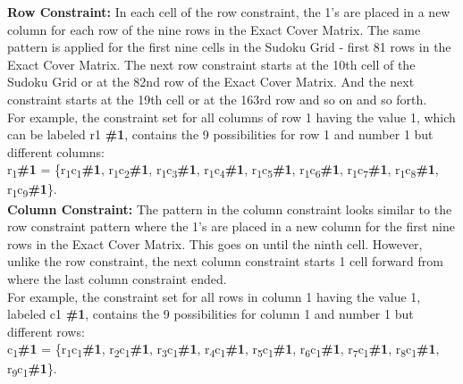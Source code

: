 \documentclass[a4paper,oneside,11pt]{report}
\begin{document}
\textbf{Row Constraint:} In each cell of the row constraint, the 1’s are placed in a new column for each row of the nine rows in the Exact Cover Matrix. The same pattern is applied for the first nine cells in the Sudoku Grid - first 81 rows in the Exact Cover Matrix. The next row constraint starts at the 10th cell of the Sudoku Grid or at the 82nd row of the Exact Cover Matrix. And the next constraint starts at the 19th cell or at the 163rd row and so on and so forth.\\
For example, the constraint set for all columns of row 1 having the value 1, which can be labeled r1 \textbf{\#1}, contains the 9 possibilities for row 1 and number 1 but different columns:\\
r\textsubscript{1}\textbf{\#1} = \{r\textsubscript{1}c\textsubscript{1}\textbf{\#1}, r\textsubscript{1}c\textsubscript{2}\textbf{\#1}, r\textsubscript{1}c\textsubscript{3}\textbf{\#1}, r\textsubscript{1}c\textsubscript{4}\textbf{\#1}, r\textsubscript{1}c\textsubscript{5}\textbf{\#1}, r\textsubscript{1}c\textsubscript{6}\textbf{\#1}, r\textsubscript{1}c\textsubscript{7}\textbf{\#1}, r\textsubscript{1}c\textsubscript{8}\textbf{\#1}, r\textsubscript{1}c\textsubscript{9}\textbf{\#1}\}.\\

\textbf{Column Constraint:} The pattern in the column constraint looks similar to the row constraint pattern where the 1’s are placed in a new column for the first nine rows in the Exact Cover Matrix. This goes on until the ninth cell. However, unlike the row constraint, the next column constraint starts 1 cell forward from where the last column constraint ended.\\

For example, the constraint set for all rows in column 1 having the value 1, labeled c1 \textbf{\#1}, contains the 9 possibilities for column 1 and number 1 but different rows:\\
c\textsubscript{1}\textbf{\#1} = \{r\textsubscript{1}c\textsubscript{1}\textbf{\#1}, r\textsubscript{2}c\textsubscript{1}\textbf{\#1}, r\textsubscript{3}c\textsubscript{1}\textbf{\#1}, r\textsubscript{4}c\textsubscript{1}\textbf{\#1}, r\textsubscript{5}c\textsubscript{1}\textbf{\#1}, r\textsubscript{6}c\textsubscript{1}\textbf{\#1}, r\textsubscript{7}c\textsubscript{1}\textbf{\#1}, r\textsubscript{8}c\textsubscript{1}\textbf{\#1}, r\textsubscript{9}c\textsubscript{1}\textbf{\#1}\}.\\
\end{document}
